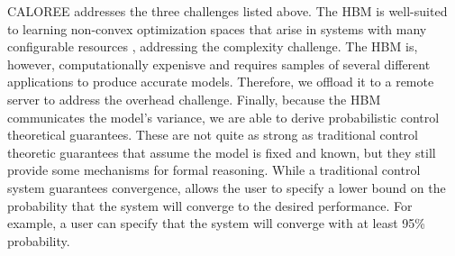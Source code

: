 CALOREE addresses the three challenges listed above.  The HBM is
well-suited to learning non-convex optimization spaces that arise in
systems with many configurable resources \cite{LEO}, addressing the
complexity challenge.  The HBM is, however, computationally expenisve
and requires samples of several different applications to produce
accurate models.  Therefore, we offload it to a remote server to
address the overhead challenge.  Finally, because the HBM communicates
the model's variance, we are able to derive probabilistic control
theoretical guarantees.  These are not quite as strong as traditional
control theoretic guarantees that assume the model is fixed and known,
but they still provide some mechanisms for formal reasoning.  While a
traditional control system guarantees convergence, \SYSTEM{} allows
the user to specify a lower bound on the probability that the system
will converge to the desired performance.  For example, a user can
specify that the system will converge with at least 95\% probability.

